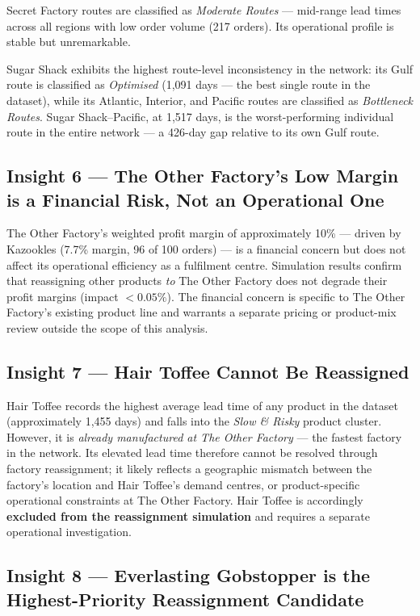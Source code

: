 \documentclass[12pt, a4paper]{article}
\begin{document}
Secret Factory routes are classified as \emph{Moderate Routes} ---
mid-range lead times across all regions with low order volume
(217 orders). Its operational profile is stable but unremarkable.

Sugar Shack exhibits the highest route-level inconsistency in the
network: its Gulf route is classified as \emph{Optimised}
(1,091 days --- the best single route in the dataset), while its
Atlantic, Interior, and Pacific routes are classified as
\emph{Bottleneck Routes}. Sugar Shack--Pacific, at 1,517 days,
is the worst-performing individual route in the entire network ---
a 426-day gap relative to its own Gulf route.

\subsection{Insight 6 --- The Other Factory's Low Margin is a Financial Risk, Not an Operational One}

The Other Factory's weighted profit margin of approximately 10\%
--- driven by Kazookles (7.7\% margin, 96 of 100 orders) --- is a
financial concern but does not affect its operational efficiency
as a fulfilment centre.
Simulation results confirm that reassigning other products
\emph{to} The Other Factory does not degrade their profit margins
(impact $< 0.05\%$).
The financial concern is specific to The Other Factory's existing
product line and warrants a separate pricing or product-mix review
outside the scope of this analysis.

\subsection{Insight 7 --- Hair Toffee Cannot Be Reassigned}

Hair Toffee records the highest average lead time of any product
in the dataset (approximately 1,455 days) and falls into the
\emph{Slow \& Risky} product cluster.
However, it is \emph{already manufactured at The Other Factory} ---
the fastest factory in the network.
Its elevated lead time therefore cannot be resolved through factory
reassignment; it likely reflects a geographic mismatch between the
factory's location and Hair Toffee's demand centres, or
product-specific operational constraints at The Other Factory.
Hair Toffee is accordingly \textbf{excluded from the reassignment
simulation} and requires a separate operational investigation.

\subsection{Insight 8 --- Everlasting Gobstopper is the Highest-Priority Reassignment Candidate}
\end{document}
